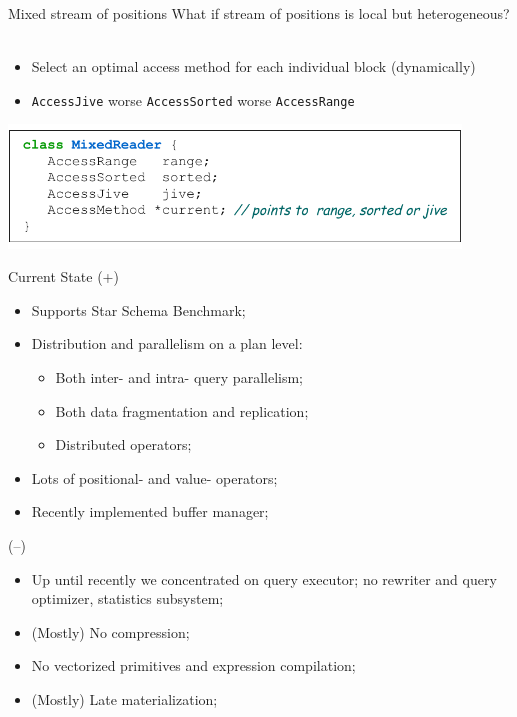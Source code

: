\documentclass[compress, dvipsnames, unicode]{beamer}
\begin{document}
\begin{frame}{Mixed stream of positions}
What if stream of positions is local but heterogeneous?
\\~\\
\begin{itemize}
\item Select an optimal access method for each individual block (dynamically)
\item \texttt{AccessJive} worse \texttt{AccessSorted} worse \texttt{AccessRange}
\end{itemize}
\vspace{1em}
\centering
\includegraphics[width=0.9\textwidth]{images/access_jive.pdf} 
\end{frame}

\begin{frame}{Current State}
(+)
\begin{itemize}
\item Supports Star Schema Benchmark;
\item Distribution and parallelism on a plan level:
\begin{itemize}
    \item Both inter- and intra- query parallelism;
    \item Both data fragmentation and replication;
    \item Distributed operators;
\end{itemize}

\item Lots of positional- and value- operators;
\item Recently implemented buffer manager;
\end{itemize}

(--)
\begin{itemize}
\item Up until recently we concentrated on query executor; no rewriter and query optimizer, statistics subsystem;
\item (Mostly) No compression;
\item No vectorized primitives and expression compilation;
\item (Mostly) Late materialization;
\end{itemize}
\end{frame}
\end{document}
